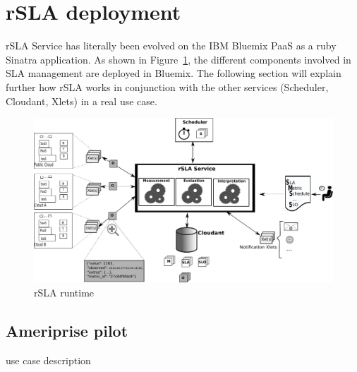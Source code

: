 \section{rSLA deployment }

rSLA Service has literally been evolved on the IBM Bluemix PaaS as a ruby Sinatra application. As shown in Figure~\ref{fig:runtime}, the different components involved in SLA 
management are deployed in Bluemix. The following section will explain further how rSLA works in conjunction with the other services (Scheduler, Cloudant, Xlets) in a real use 
case. 



\begin{figure}[H]
\centering
\includegraphics[width=\textwidth]{pics/runtime.pdf}
\caption{\label{fig:runtime} rSLA runtime}
\end{figure}


\subsection{Ameriprise pilot}
use case description

